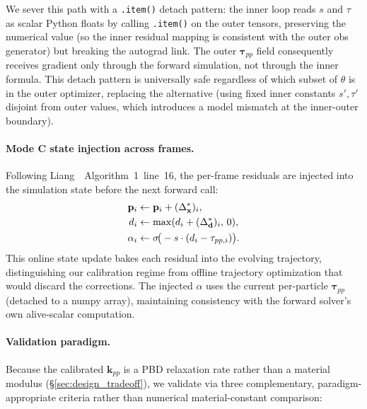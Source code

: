 \documentclass[letterpaper, 10 pt, conference]{ieeeconf}  %
\theoremstyle{tight}
\begin{document}
We sever this path with a \texttt{.item()} detach pattern: the inner
loop reads $s$ and $\tau$ as scalar Python floats by calling
\texttt{.item()} on the outer tensors, preserving the numerical value
(so the inner residual mapping is consistent with the outer obs
generator) but breaking the autograd link. The outer
$\boldsymbol{\tau}_{pp}$ field consequently receives gradient only
through the forward simulation, not through the inner formula. This
detach pattern is universally safe regardless of which subset of $\theta$
is in the outer optimizer, replacing the alternative (using fixed
inner constants $s', \tau'$ disjoint from outer values, which introduces
a model mismatch at the inner-outer boundary).

\paragraph{Mode C state injection across frames.}
Following Liang~\cite{liang2023}~Algorithm~1~line~16, the per-frame
residuals are injected into the simulation state before the next
forward call:
\begin{align}
  \mathbf{p}_i &\leftarrow \mathbf{p}_i + (\Delta_{\mathbf{x}}^{*})_i, \notag\\
  d_i          &\leftarrow \max(d_i + (\Delta_{\mathbf{d}}^{*})_i,\,0), \\
  \alpha_i     &\leftarrow \sigma\!\big(-s\cdot(d_i - \tau_{pp,i})\big). \notag
  \label{eq:mode-c-inject}
\end{align}
This online state update bakes each residual into the evolving
trajectory, distinguishing our calibration regime from offline trajectory
optimization that would discard the corrections. The injected $\alpha$
uses the current per-particle $\boldsymbol{\tau}_{pp}$ (detached to a
numpy array), maintaining consistency with the forward solver's own
alive-scalar computation.

\paragraph{Validation paradigm.}
Because the calibrated $\mathbf{k}_{pp}$ is a PBD relaxation rate rather
than a material modulus (\S\ref{sec:design_tradeoff}), we validate via
three complementary, paradigm-appropriate criteria rather than numerical
material-constant comparison:
\end{document}
